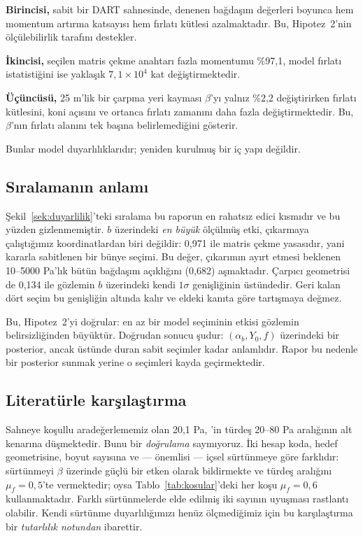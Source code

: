 \documentclass[12pt,a4paper]{article}
\begin{document}
\textbf{Birincisi,} sabit bir DART sahnesinde, denenen bağdaşım değerleri
boyunca hem momentum artırma katsayısı hem fırlatı kütlesi azalmaktadır.
Bu, Hipotez~2'nin ölçülebilirlik tarafını destekler.

\textbf{İkincisi,} seçilen matris çekme anahtarı fazla momentumu \%97,1,
model fırlatı istatistiğini ise yaklaşık $7{,}1\times10^{4}$ kat
değiştirmektedir.

\textbf{Üçüncüsü,} 25 m'lik bir çarpma yeri kayması $\beta$'yı yalnız
\%2,2 değiştirirken fırlatı kütlesini, koni açısını ve ortanca fırlatı
zamanını daha fazla değiştirmektedir. Bu, $\beta$'nın fırlatı alanını tek
başına belirlemediğini gösterir.

Bunlar model duyarlılıklarıdır; yeniden kurulmuş bir iç yapı değildir.

\subsection{Sıralamanın anlamı}

Şekil~\ref{sek:duyarlilik}'teki sıralama bu raporun en rahatsız edici
kısmıdır ve bu yüzden gizlenmemiştir. $b$ üzerindeki \emph{en büyük}
ölçülmüş etki, çıkarmaya çalıştığımız koordinatlardan biri değildir:
0,971 ile matris çekme yasasıdır, yani kararla sabitlenen bir bünye
seçimi. Bu değer, çıkarımın ayırt etmesi beklenen 10--5000 Pa'lık bütün
bağdaşım açıklığını (0,682) aşmaktadır. Çarpıcı geometrisi de 0,134 ile
gözlemin $b$ üzerindeki kendi $1\sigma$ genişliğinin üstündedir. Geri
kalan dört seçim bu genişliğin altında kalır ve eldeki kanıta göre
tartışmaya değmez.

Bu, Hipotez~2'yi doğrular: en az bir model seçiminin etkisi gözlemin
belirsizliğinden büyüktür. Doğrudan sonucu şudur: $(\alpha_b, Y_0, f)$
üzerindeki bir posterior, ancak üstünde duran sabit seçimler kadar
anlamlıdır. Rapor bu nedenle bir posterior sunmak yerine o seçimleri
kayda geçirmektedir.

\subsection{Literatürle karşılaştırma}

Sahneye koşullu aradeğerlememiz olan 20,1 Pa, \citet{senel2025}'in
türdeş 20--80 Pa aralığının alt kenarına düşmektedir. Bunu bir
\emph{doğrulama} saymıyoruz. İki hesap koda, hedef geometrisine, boyut
sayısına ve --- önemlisi --- içsel sürtünmeye göre farklıdır:
\citet{senel2025} sürtünmeyi $\beta$ üzerinde güçlü bir etken olarak
bildirmekte ve türdeş aralığını $\mu_f=0{,}5$'te vermektedir; oysa
Tablo~\ref{tab:kosular}'deki her koşu $\mu_f=0{,}6$ kullanmaktadır.
Farklı sürtünmelerde elde edilmiş iki sayının uyuşması rastlantı
olabilir. Kendi sürtünme duyarlılığımızı henüz ölçmediğimiz için bu
karşılaştırma bir \emph{tutarlılık notundan} ibarettir.
\end{document}
